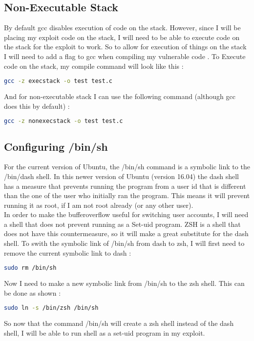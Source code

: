 \documentclass[14pt]{extarticle}
\begin{document}
\subsection{Non-Executable Stack}
By default gcc disables execution of code on the stack. However, since I will be placing my exploit code on the stack, I will need to be able to execute code on the stack for the exploit to work. So to allow for execution of things on the stack I will need to add a flag to gcc when compiling my vulnerable code \cite{seed-bof}.
To Execute code on the stack, my compile command will look like this \cite{seed-bof}:
\begin{lstlisting}[language=sh]
   gcc -z execstack -o test test.c
\end{lstlisting}
And for non-executable stack I can use the following command (although gcc does this by default) \cite{seed-bof}:
\begin{lstlisting}[language=sh]
   gcc -z nonexecstack -o test test.c
\end{lstlisting}

\subsection{Configuring /bin/sh}
For the current version of Ubuntu, the /bin/sh command is a symbolic link to the /bin/dash shell. In this newer version of Ubuntu (version 16.04) the dash shell has a measure that prevents running the program from a user id that is different than the one of the user who initially ran the program. This means it will prevent running it as root, if I am not root already (or any other user). \\
In order to make the bufferoverflow useful for switching user accounts, I will need a shell that does not prevent running as a Set-uid program. ZSH is a shell that does not have this countermeasure, so it will make a great substitute for the dash shell. To swith the symbolic link of /bin/sh from dash to zsh, I will first need to remove the current symbolic link to dash \cite{seed-bof}:
\begin{lstlisting}[language=sh]
  sudo rm /bin/sh
\end{lstlisting}
Now I need to make a new symbolic link from /bin/sh to the zsh shell. This can be done as shown \cite{seed-bof}:
\begin{lstlisting}[language=sh]
  sudo ln -s /bin/zsh /bin/sh
\end{lstlisting}
So now that the command /bin/sh will create a zsh shell instead of the dash shell, I will be able to run shell as a set-uid program in my exploit.
\end{document}
